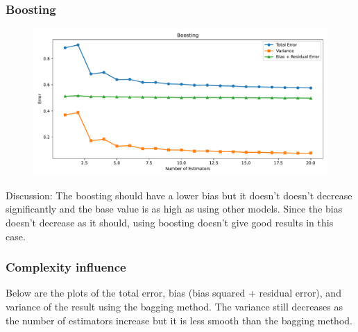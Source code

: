 \documentclass[a4paper,10pt]{article}
\begin{document}
\subsubsection{Boosting}
\begin{figure}[H]
    \centering
    \includegraphics[width=0.8\linewidth]{images/2.5_boosting.pdf}
\end{figure}

Discussion:
The boosting should have a lower bias but it doesn't doesn't decrease significantly and the base value is as high as using other models. Since the bias doesn't decrease as it should, using boosting doesn't give good results in this case.

\subsubsection{Complexity influence}

Below are the plots of the total error, bias (bias squared + residual error), and variance of the result using the bagging method. The variance still decreases as the number of estimators increase but it is less smooth than the bagging method.
\end{document}
